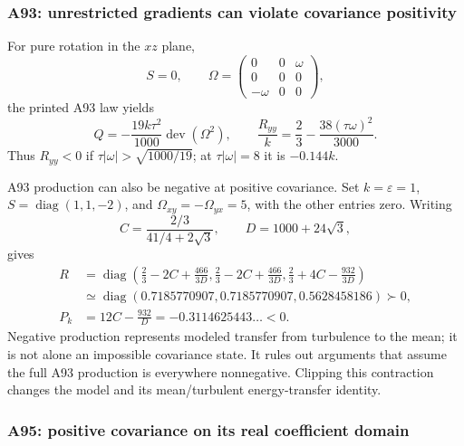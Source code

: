 \documentclass[11pt,a4paper]{article}
\numberwithin{equation}{section}
\newcommand{\eps}{\varepsilon}
\DeclareMathOperator{\dev}{dev}
\DeclareMathOperator{\diag}{diag}
\begin{document}
\subsubsection{A93: unrestricted gradients can violate covariance positivity}

For pure rotation in the $xz$ plane,
\[
 S=0,\qquad
 \Omega=\begin{pmatrix}0&0&\omega\\0&0&0\\-\omega&0&0\end{pmatrix},
\]
the printed A93 law yields
\begin{equation}
 Q=-\frac{19k\tau^2}{1000}\dev(\Omega^2),\qquad
 \frac{R_{yy}}k=\frac23-\frac{38(\tau\omega)^2}{3000}.
 \label{st:a93-rotation}
\end{equation}
Thus $R_{yy}<0$ if $\tau|\omega|>\sqrt{1000/19}$; at
$\tau|\omega|=8$ it is $-0.144k$.

A93 production can also be negative at positive covariance. Set
$k=\eps=1$, $S=\diag(1,1,-2)$, and
$\Omega_{xy}=-\Omega_{yx}=5$, with the other entries zero.
Writing
\[
 C=\frac{2/3}{41/4+2\sqrt3},\qquad D=1000+24\sqrt3,
\]
gives
\begin{equation}
 \begin{aligned}
 R&=\diag\left(\frac23-2C+\frac{466}{3D},
              \frac23-2C+\frac{466}{3D},
              \frac23+4C-\frac{932}{3D}\right)\\
  &\simeq\diag(0.7185770907,0.7185770907,0.5628458186)\succ0,\\
 P_k&=12C-\frac{932}{D}=-0.3114625443\ldots<0.
 \end{aligned}
 \label{st:a93-negative-production}
\end{equation}
Negative production represents modeled transfer from turbulence to
the mean; it is not alone an impossible covariance state. It rules
out arguments that assume the full A93 production is everywhere
nonnegative. Clipping this contraction changes the model and its
mean/turbulent energy-transfer identity.

\subsubsection{A95: positive covariance on its real coefficient domain}
\end{document}
